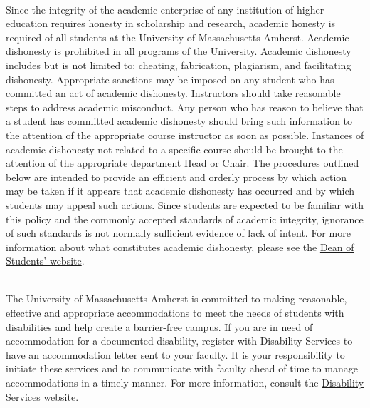 \documentclass[10pt]{article}
\begin{document}
\bigskip
{} \\
Since the integrity of the academic enterprise of any institution of higher education requires honesty in scholarship and research, academic honesty is required of all students at the University of Massachusetts Amherst. Academic dishonesty is prohibited in all programs of the University. Academic dishonesty includes but is not limited to: cheating, fabrication, plagiarism, and facilitating dishonesty. Appropriate sanctions may be imposed on any student who has committed an act of academic dishonesty. Instructors should take reasonable steps to address academic misconduct. Any person who has reason to believe that a student has committed academic dishonesty should bring such information to the attention of the appropriate course instructor as soon as possible. Instances of academic dishonesty not related to a specific course should be brought to the attention of the appropriate department Head or Chair. The procedures outlined below are intended to provide an efficient and orderly process by which action may be taken if it appears that academic dishonesty has occurred and by which students may appeal such actions. Since students are expected to be familiar with this policy and the commonly accepted standards of academic integrity, ignorance of such standards is not normally sufficient evidence of lack of intent.
For more information about what constitutes academic dishonesty, please see the \href{http://umass.edu/dean_students/codeofconduct/acadhonesty/}{Dean of Students' website}.


\bigskip
{} \\
The University of Massachusetts Amherst is committed to making reasonable, effective and appropriate accommodations to meet the needs of students with disabilities and help create a barrier-free campus. If you are in need of accommodation for a documented disability, register with Disability Services to have an accommodation letter sent to your faculty. It is your responsibility to initiate these services and to communicate with faculty ahead of time to manage accommodations in a timely manner. For more information, consult the \href{http://www.umass.edu/disability/}{Disability Services website}.
\end{document}
